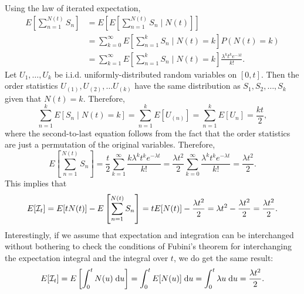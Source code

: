 \documentclass{homework}
\begin{document}
\begin{alphaparts}
		\questionpart Using the law of iterated expectation,
		\begin{align*}
			E\left[\sum_{n=1}^{N(t)}S_n\right] &= E\left[E\left[\sum_{n=1}^{N(t)} S_n \mid N(t)\right]\right] \\
			&= \sum_{k=0}^\infty E\left[\sum_{n=1}^k S_n \mid N(t) = k\right]P(N(t) = k) \\
			&= \sum_{k=1}^\infty E\left[\sum_{n=1}^kS_n \mid N(t)=k\right]\frac{\lambda^kt^k e^{-\lambda t}}{k!}.
		\end{align*}
		Let $U_1, \dots, U_k$ be i.i.d. uniformly-distributed random variables on $[0,t]$. Then the order statistics $U_{(1)}, U_{(2)}, \dots U_{(k)}$ have the same distribution as $S_1, S_2, \dots, S_k$ given that $N(t) = k$. Therefore,
		\begin{equation*}
			\sum_{n=1}^k E[S_n \mid N(t) = k] = \sum_{n=1}^kE[U_{(n)}] = \sum_{n=1}^kE[U_n] = \frac{kt}{2},
		\end{equation*}
		where the second-to-last equation follows from the fact that the order statistics are just a permutation of the original variables. Therefore,
		\begin{equation*}
				E\left[\sum_{n=1}^{N(t)}S_n\right] = \frac{t}{2}\sum_{k=1}^\infty \frac{k\lambda^kt^ke^{-\lambda t}}{k!} = \frac{\lambda t^2}{2}\sum_{k=0}^\infty \frac{\lambda^k t^ke^{-\lambda t}}{k!} = \frac{\lambda t^2}{2}.
		\end{equation*}
		This implies that
		\begin{equation*}
			E[\mathcal{I}_t] = E[tN(t)] - E\left[\sum_{n=1}^{N(t)}S_n\right] = tE[N(t)] - \frac{\lambda t^2}{2} = \lambda t^2 - \frac{\lambda t^2}{2} = \frac{\lambda t^2}{2}.
		\end{equation*}
		Interestingly, if we assume that expectation and integration can be interchanged without bothering to check the conditions of Fubini's theorem for interchanging the expectation integral and the integral over $t$, we do get the same result:
		\begin{equation*}
			E[\mathcal{I}_t] = E\left[\int_0^t N(u)\;\text{d} u\right] = \int_0^tE[N(u)]\;\text{d} u = \int_0^t \lambda u\;\text{d} u = \frac{\lambda t^2}{2}.
		\end{equation*}
	\end{alphaparts}
	
\end{document}

